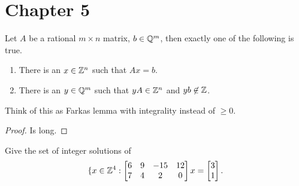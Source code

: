 \documentclass{exam}
\begin{document}
    \section{Chapter 5}
    \begin{theorem}
        Let $A$ be a rational $m \times n$ matrix, $b \in \mathbb{Q}^m$, then exactly one of the following is true.
        \begin{enumerate}
            \item There is an $x \in \mathbb{Z}^n$ such that $Ax=b$.
            \item There is an $y \in \mathbb{Q}^m$ such that $yA \in \mathbb{Z}^n$ and $yb \not \in \mathbb{Z}$.
        \end{enumerate}
    \end{theorem}
    Think of this as Farkas lemma with integrality instead of $\ge 0$.
    \begin{proof}
        Is long. %
    \end{proof}

    \begin{question}
        Give the set of integer solutions of
        \[
            \{ x \in \integers^4 : \matrix{6 & 9 & - 15 & 12 \\ 7 & 4 & 2 & 0} x = \matrix{3 \\ 1}.
        \]
    \end{question}
\end{document}
